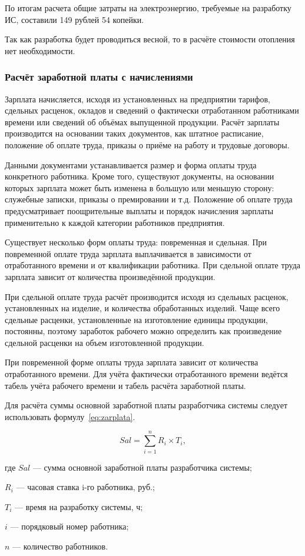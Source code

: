 По итогам расчета общие затраты на электроэнергию, требуемые на разработку ИС, составили 149 рублей 54 копейки.

Так как разработка будет проводиться весной, то в расчёте стоимости отопления нет необходимости.

\subsubsection{Расчёт заработной платы с начислениями}

Зарплата начисляется, исходя из установленных на предприятии тарифов, сдельных расценок, окладов и сведений о фактически отработанном работниками времени или сведений об объёмах выпущенной продукции.
Расчёт зарплаты производится на основании таких документов, как штатное расписание, положение об оплате труда, приказы о приёме на работу и трудовые договоры.

Данными документами устанавливается размер и форма оплаты труда конкретного работника.
Кроме того, существуют документы, на основании которых зарплата может быть изменена в большую или меньшую сторону: служебные записки, приказы о премировании и т.д.
Положение об оплате труда предусматривает поощрительные выплаты и порядок начисления зарплаты применительно к каждой категории работников предприятия. 

Существует несколько форм оплаты труда: повременная и сдельная. При повременной оплате труда зарплата выплачивается в зависимости от отработанного времени и от квалификации работника.
При сдельной оплате труда зарплата зависит от количества произведённой продукции. 

При сдельной оплате труда расчёт производится исходя из сдельных расценок, установленных на изделие, и количества обработанных изделий. Чаще всего сдельные расценки, установленные на изготовление единицы продукции, постоянны, поэтому заработок рабочего можно определить как произведение сдельной расценки на объем изготовленной продукции.

При повременной форме оплаты труда зарплата зависит от количества отработанного времени. Для учёта фактически отработанного времени ведётся табель учёта рабочего времени и табель расчёта заработной платы.

Для расчёта суммы основной заработной платы разработчика системы следует использовать формулу~\ref{eq:zarplata}. 

\begin{equation}
	\label{eq:zarplata}
	Sal =  \sum^{n}_{i=1} R_i \times T_i,
\end{equation}
\begin{ESKDexplanation}
	\item где $Sal$ --- сумма основной заработной платы разработчика системы;
	\item $R_i$ --- часовая ставка i-го работника, руб.;
	\item $T_{i}$ --- время на разработку системы, ч;
	\item $i$ --- порядковый номер работника;
	\item $n$ --- количество работников.
\end{ESKDexplanation}

